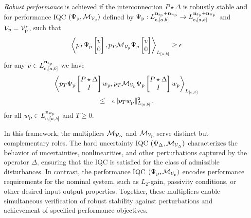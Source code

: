 \begin{definition}
\label{def:robust-performance}\emph{Robust performance} is achieved if the interconnection $P \star \Delta$
is {robustly stable} and for performance IQC $(\Psi_{{\mathrm{p}}}, \mathcal{M}_{\mathcal{V}_{{\mathrm{p}}}})$ defined by $\Psi_{{\mathrm{p}}}:
L^{\mathbf{n}_{{\mathrm{z}}_{{\mathrm{p}}}} + \mathbf{n}_{{\mathrm{w}}_{{\mathrm{p}}}}}_{{\mathrm{e}}, [a,b]}
\to
L^{\mathbf{n}_{\tilde{{\mathrm{z}}}_{{\mathrm{p}}}} + \mathbf{n}_{\tilde{{\mathrm{w}}}_{{\mathrm{p}}}}}_{{\mathrm{e}}, [a,b]}$ and
$\mathcal{V}_{{\mathrm{p}}}=\mathcal{V}_{{\mathrm{p}}}^*$, such that
\[\left\langle p_T \Psi_{{\mathrm{p}}}\begin{bmatrix}v \\ 0\end{bmatrix}, p_T\mathcal{M}_{\mathcal{V}_{{\mathrm{p}}}}\Psi_{{\mathrm{p}}}\begin{bmatrix}v\\ 0\end{bmatrix} \right\rangle_{L_{[a,b]}}\geq \epsilon\]
for any $v\in L_{{\mathrm{e}},[a,b]}^{\mathbf{n}_{{\mathrm{z}}_{{\mathrm{p}}}}}$ we have 
\begin{gather*}
\left\langle p_T\Psi_{{\mathrm{p}}}\begin{bmatrix}P\star\Delta\\I\end{bmatrix}w_{{\mathrm{p}}}, p_T\mathcal{M}_{\mathcal{V}_{{\mathrm{p}}}}\Psi_{{\mathrm{p}}}\begin{bmatrix}P\star\Delta\\I\end{bmatrix}w_{{\mathrm{p}}} \right\rangle_{L_{[a,b]}}
\\ \leq -\epsilon\|p_Tw_{{\mathrm{p}}}\|_{L_{[a,b]}}^2.
\end{gather*}
for all $w_{{\mathrm{p}}}\in L_{{\mathrm{e}},[a,b]}^{\mathbf{n}_{{\mathrm{w}}_{{\mathrm{p}}}}}$ and $T \geq 0$. 
\end{definition}
In this framework, the multipliers $\mathcal{M}_{\mathcal{V} _\Delta}$ and
$\mathcal{M}_{{\mathcal{V}}_{{\mathrm{p}}}}$ serve distinct but complementary roles.
The hard uncertainty IQC $(\Psi_\Delta, \mathcal{M}_{\mathcal{V}_\Delta})$ characterizes the behavior of uncertainties,
nonlinearities, and other perturbations captured by the operator $\Delta$,
ensuring that the IQC is satisfied for the class of admissible disturbances.
In contrast, the performance IQC $(\Psi_{{\mathrm{p}}}, \mathcal{M}_{\mathcal{V}_{{\mathrm{p}}}})$ encodes performance
requirements for the nominal system, such as $L_2$-gain, passivity
conditions, or other desired input-output properties.
Together, these multipliers enable simultaneous verification of robust stability
against perturbations and achievement of specified performance objectives.
